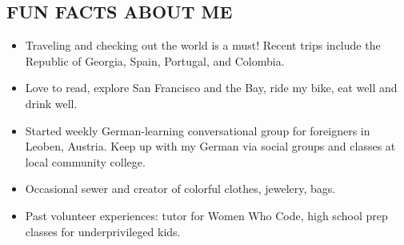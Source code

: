 \documentclass[11pt]{res} %
\begin{document}
\begin{resume}
\section{FUN FACTS ABOUT ME} 
 \vspace{15pt}
\begin{itemize}  \itemsep -1pt 
	\item Traveling and checking out the world is a must! Recent trips include the Republic of Georgia, Spain, Portugal, and Colombia. 
	\item Love to read, explore San Francisco and the Bay, ride my bike, eat well and drink well. 
  \item Started weekly German-learning conversational group for foreigners in Leoben, Austria. Keep up with my German via social groups and classes at local community college.
  \item Occasional sewer and creator of colorful clothes, jewelery, bags.
	\item Past volunteer experiences: tutor for Women Who Code, high school prep classes for underprivileged kids.
\end{itemize} 

%
\end{resume}
\end{document}
